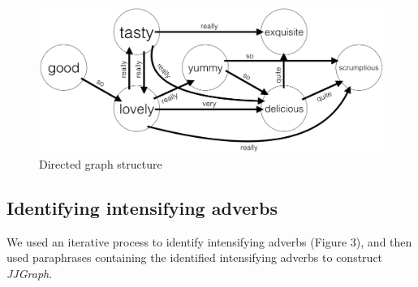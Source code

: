 \documentclass[11pt,a4paper]{article}
\begin{document}
\begin{figure}[t]
	\includegraphics[width=\columnwidth]{graph.png}
	\caption{Directed graph structure}
\end{figure} 


\subsection{Identifying intensifying adverbs}

We used an iterative process to identify intensifying adverbs (Figure 3), and then used paraphrases containing the identified intensifying adverbs to construct \textit{JJGraph}. 
\end{document}
